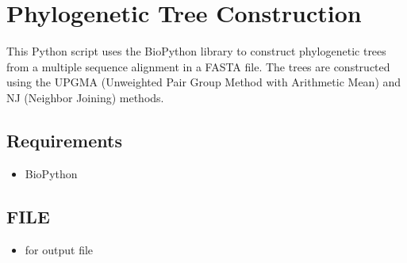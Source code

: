 \documentclass[11pt]{article}
\providecommand{\tightlist}{%
      \setlength{\itemsep}{0pt}\setlength{\parskip}{0pt}}
\begin{document}
    \section{Phylogenetic Tree
Construction}\label{phylogenetic-tree-construction}

This Python script uses the BioPython library to construct phylogenetic
trees from a multiple sequence alignment in a FASTA file. The trees are
constructed using the UPGMA (Unweighted Pair Group Method with
Arithmetic Mean) and NJ (Neighbor Joining) methods.

\subsection{Requirements}\label{requirements}

\begin{itemize}
\tightlist
\item
  BioPython
\end{itemize}

\subsection{FILE}\label{file}

    \begin{itemize}
\tightlist
\item
  for output file
\end{itemize}
\end{document}
